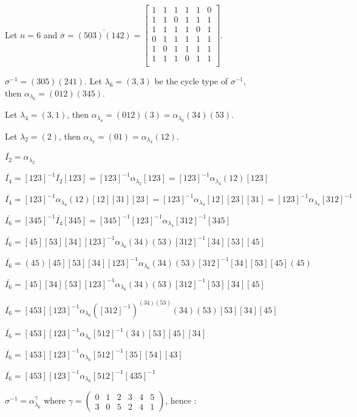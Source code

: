 \documentclass[a4paper,12pt,fleqn]{article}
\begin{document}
  \begin{figure}
 Let $n=6$ and
 $\overline{\sigma}=\overline{(503)(142)}
 =\begin{bmatrix}
      1&1&1&1&1&0\\
      1&1&0&1&1&1\\
      1&1&1&1&0&1\\      
      0&1&1&1&1&1\\
      1&0&1&1&1&1\\
      1&1&1&0&1&1\\
    \end{bmatrix}$.
    
    $\sigma^{-1}=(305)(241)$. Let $\lambda_6=(3,3)$ be the cycle type of $\sigma^{-1}$, then $\alpha_{\lambda_6}=(012)(345)$.
    
    Let $\lambda_4=(3,1)$, then $\alpha_{\lambda_4}=(012)(3)=\alpha_{\lambda_6}(34)(53)$.

    Let $\lambda_2=(2)$, then $\alpha_{\lambda_2}=(01)=\alpha_{\lambda_4}(12)$.

    $\overline{I_2}=\alpha_{\lambda_2}$

    $\overline{I_4}=[123]^{-1}\overline{I_2}[123]=[123]^{-1}\alpha_{\lambda_2}[123]=[123]^{-1}\alpha_{\lambda_4}(12)[123]$

    $\overline{I_4}=[123]^{-1}\alpha_{\lambda_4}(12)[12][31][23]=[123]^{-1}\alpha_{\lambda_4}[12][23][31]=[123]^{-1}\alpha_{\lambda_4}[312]^{-1}$

    $\overline{I_6}=[345]^{-1}\overline{I_4}[345]=[345]^{-1}[123]^{-1}\alpha_{\lambda_4}[312]^{-1}[345]$

    $\overline{I_6}=[45][53][34][123]^{-1}\alpha_{\lambda_6}(34)(53)[312]^{-1}[34][53][45]$
    
    $\overline{I_6}=(45)[45][53][34][123]^{-1}\alpha_{\lambda_6}(34)(53)[312]^{-1}[34][53][45](45)$

    $\overline{I_6}=[45][34][53][123]^{-1}\alpha_{\lambda_6}(34)(53)[312]^{-1}[53][34][45]$

    $\overline{I_6}=[453][123]^{-1}\alpha_{\lambda_6}\left([312]^{-1}\right)^{(34)(53)}(34)(53)[53][34][45]$

    $\overline{I_6}=[453][123]^{-1}\alpha_{\lambda_6}[512]^{-1}(34)[53][45][34]$

    $\overline{I_6}=[453][123]^{-1}\alpha_{\lambda_6}[512]^{-1}[35][54][43]$

    $\overline{I_6}=[453][123]^{-1}\alpha_{\lambda_6}[512]^{-1}[435]^{-1}$

    $\sigma^{-1}=\alpha_{\lambda_6}^{\gamma}$
    where $\gamma=\begin{pmatrix}
      0&1&2&3&4&5\\
      3&0&5&2&4&1\end{pmatrix}$, hence :


\end{figure}
\end{document}
